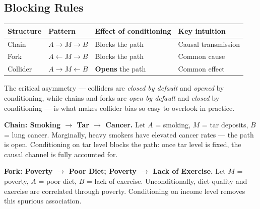 \documentclass[
  a4paper,
]{book}
\newcounter{none} %
\begin{document}
\subsection{Blocking Rules}\label{blocking-rules}

{\def\LTcaptype{none} %
\begin{longtable}[]{@{}
  >{\raggedright\arraybackslash}p{}
  >{\raggedright\arraybackslash}p{}
  >{\raggedright\arraybackslash}p{}
  >{\raggedright\arraybackslash}p{}@{}}
\toprule\noalign{}
\begin{minipage}[b]{\linewidth}\raggedright
\textbf{Structure}
\end{minipage} & \begin{minipage}[b]{\linewidth}\raggedright
\textbf{Pattern}
\end{minipage} & \begin{minipage}[b]{\linewidth}\raggedright
\textbf{Effect of conditioning}
\end{minipage} & \begin{minipage}[b]{\linewidth}\raggedright
\textbf{Key intuition}
\end{minipage} \\
\midrule\noalign{}
\endhead
\bottomrule\noalign{}
\endlastfoot
Chain & \(A \to M \to B\) & Blocks the path & Causal transmission \\
Fork & \(A \leftarrow M \to B\) & Blocks the path & Common cause \\
Collider & \(A \to M \leftarrow B\) & \textbf{Opens} the path & Common
effect \\
\end{longtable}
}

The critical asymmetry --- colliders are \emph{closed by default} and
\emph{opened} by conditioning, while chains and forks are \emph{open by
default} and \emph{closed} by conditioning --- is what makes collider
bias so easy to overlook in practice.

\textbf{Chain: Smoking \(\to\) Tar \(\to\) Cancer.} Let \(A\) = smoking,
\(M\) = tar deposits, \(B\) = lung cancer. Marginally, heavy smokers
have elevated cancer rates --- the path is open. Conditioning on tar
level blocks the path: once tar level is fixed, the causal channel is
fully accounted for.

\textbf{Fork: Poverty \(\to\) Poor Diet; Poverty \(\to\) Lack of
Exercise.} Let \(M\) = poverty, \(A\) = poor diet, \(B\) = lack of
exercise. Unconditionally, diet quality and exercise are correlated
through poverty. Conditioning on income level removes this spurious
association.
\end{document}
